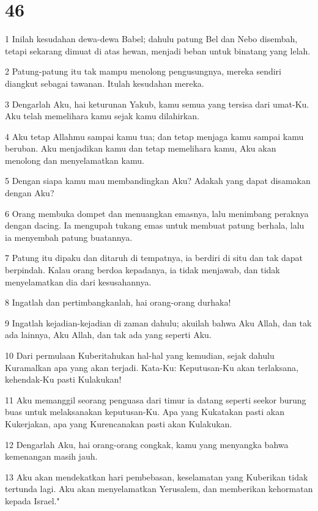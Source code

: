 \chapter{46}

\par 1 Inilah kesudahan dewa-dewa Babel; dahulu patung Bel dan Nebo disembah, tetapi sekarang dimuat di atas hewan, menjadi beban untuk binatang yang lelah.
\par 2 Patung-patung itu tak mampu menolong pengusungnya, mereka sendiri diangkut sebagai tawanan. Itulah kesudahan mereka.
\par 3 Dengarlah Aku, hai keturunan Yakub, kamu semua yang tersisa dari umat-Ku. Aku telah memelihara kamu sejak kamu dilahirkan.
\par 4 Aku tetap Allahmu sampai kamu tua; dan tetap menjaga kamu sampai kamu beruban. Aku menjadikan kamu dan tetap memelihara kamu, Aku akan menolong dan menyelamatkan kamu.
\par 5 Dengan siapa kamu mau membandingkan Aku? Adakah yang dapat disamakan dengan Aku?
\par 6 Orang membuka dompet dan menuangkan emasnya, lalu menimbang peraknya dengan dacing. Ia mengupah tukang emas untuk membuat patung berhala, lalu ia menyembah patung buatannya.
\par 7 Patung itu dipaku dan ditaruh di tempatnya, ia berdiri di situ dan tak dapat berpindah. Kalau orang berdoa kepadanya, ia tidak menjawab, dan tidak menyelamatkan dia dari kesusahannya.
\par 8 Ingatlah dan pertimbangkanlah, hai orang-orang durhaka!
\par 9 Ingatlah kejadian-kejadian di zaman dahulu; akuilah bahwa Aku Allah, dan tak ada lainnya, Aku Allah, dan tak ada yang seperti Aku.
\par 10 Dari permulaan Kuberitahukan hal-hal yang kemudian, sejak dahulu Kuramalkan apa yang akan terjadi. Kata-Ku: Keputusan-Ku akan terlaksana, kehendak-Ku pasti Kulakukan!
\par 11 Aku memanggil seorang penguasa dari timur ia datang seperti seekor burung buas untuk melaksanakan keputusan-Ku. Apa yang Kukatakan pasti akan Kukerjakan, apa yang Kurencanakan pasti akan Kulakukan.
\par 12 Dengarlah Aku, hai orang-orang congkak, kamu yang menyangka bahwa kemenangan masih jauh.
\par 13 Aku akan mendekatkan hari pembebasan, keselamatan yang Kuberikan tidak tertunda lagi. Aku akan menyelamatkan Yerusalem, dan memberikan kehormatan kepada Israel."

